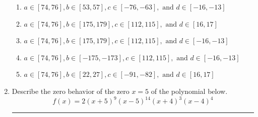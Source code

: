 \documentclass[14pt]{extbook}
\newcommand{\litem}[1]{\item#1\hspace*{-1cm}\rule{\textwidth}{0.4pt}}
\begin{document}
\begin{enumerate}
{\begin{enumerate}[label=\Alph*.]
\item \( a \in [74, 76], b \in [53, 57], c \in [-76, -63], \text{ and } d \in [-16, -13] \)
\item \( a \in [74, 76], b \in [175, 179], c \in [112, 115], \text{ and } d \in [16, 17] \)
\item \( a \in [74, 76], b \in [175, 179], c \in [112, 115], \text{ and } d \in [-16, -13] \)
\item \( a \in [74, 76], b \in [-175, -173], c \in [112, 115], \text{ and } d \in [-16, -13] \)
\item \( a \in [74, 76], b \in [22, 27], c \in [-91, -82], \text{ and } d \in [16, 17] \)

\end{enumerate} }
\litem{
Describe the zero behavior of the zero $x = 5$ of the polynomial below.\[ f(x) = 2(x + 5)^{9}(x - 5)^{14}(x + 4)^{3}(x - 4)^{4} \]\begin{enumerate}[label=\Alph*.]

\end{enumerate}}
\end{enumerate}
\end{document}
